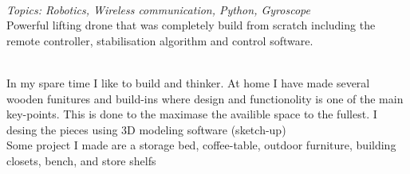  \\
\emph{Topics: Robotics, Wireless communication, Python, Gyroscope} \\
Powerful lifting drone that was completely build from scratch including the remote controller, stabilisation algorithm and control software.
\Sep

 \\
In my spare time I like to build and thinker. At home I have made several wooden funitures and build-ins where design and functionolity is one of the main key-points. This is done to the maximase the availible space to the fullest. I desing the pieces using 3D modeling software (sketch-up) \\
Some project I made are a storage bed, coffee-table, outdoor furniture, building closets, bench, and store shelfs
\Sep
